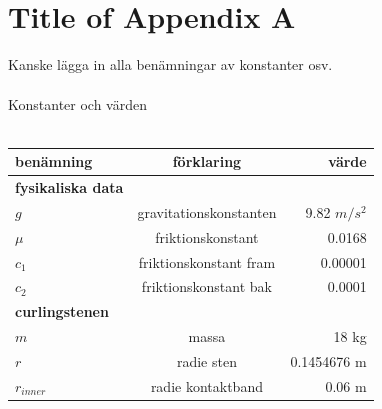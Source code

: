 \documentclass[11pt]{article} %
\begin{document}
\appendix
\section{\\Title of Appendix A} \label{App:AppendixA}
Kanske lägga in alla benämningar av konstanter osv.
\\\\Konstanter och värden\\\\


\begin{tabular}{l | c | r}
benämning & förklaring & värde \\ \hline\hline
\textbf{fysikaliska data} & & \\ \hline
$g$ & gravitationskonstanten & 9.82 $m/s^2$\\
$\mu$ & friktionskonstant & 0.0168\\
$c_1$ & friktionskonstant fram & 0.00001\\
$c_2$ & friktionskonstant bak & 0.0001\\
\textbf{curlingstenen} & & \\ \hline
$m$ & massa & 18 kg\\
$r$ & radie sten & 0.1454676 m\\
$r_{inner}$ & radie kontaktband & 0.06 m\\ \hline
\end{tabular}
\end{document}
